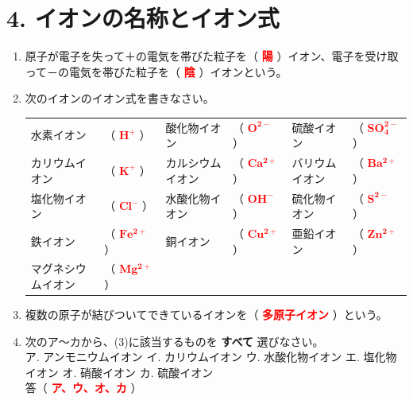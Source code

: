 \section*{4. イオンの名称とイオン式}
\begin{enumerate}
    \item 原子が電子を失って＋の電気を帯びた粒子を（ \textcolor{red}{\textbf{陽}} ）イオン、電子を受け取って－の電気を帯びた粒子を（ \textcolor{red}{\textbf{陰}} ）イオンという。
    \item 次のイオンのイオン式を書きなさい。
    
    \vspace{0.2cm}
    \hspace*{-1.5cm}
    {\renewcommand{\arraystretch}{1.5}
    \begin{tabular}{llllll}
    水素イオン&（ \textcolor{red}{$\mathbf{H^+}$} ） & 酸化物イオン&（ \textcolor{red}{$\mathbf{O^{2-}}$} ） & 硫酸イオン&（ \textcolor{red}{$\mathbf{SO_4^{2-}}$} ） \\
    カリウムイオン&（ \textcolor{red}{$\mathbf{K^+}$} ） & カルシウムイオン&（ \textcolor{red}{$\mathbf{Ca^{2+}}$} ） & バリウムイオン&（ \textcolor{red}{$\mathbf{Ba^{2+}}$} ） \\
    塩化物イオン&（ \textcolor{red}{$\mathbf{Cl^-}$} ） & 水酸化物イオン&（ \textcolor{red}{$\mathbf{OH^-}$} ） & 硫化物イオン&（ \textcolor{red}{$\mathbf{S^{2-}}$} ） \\
    鉄イオン&（ \textcolor{red}{$\mathbf{Fe^{2+}}$} ） & 銅イオン&（ \textcolor{red}{$\mathbf{Cu^{2+}}$} ） & 亜鉛イオン&（ \textcolor{red}{$\mathbf{Zn^{2+}}$} ） \\
    マグネシウムイオン&（ \textcolor{red}{$\mathbf{Mg^{2+}}$} ） &&& & \\
    \end{tabular}}
    \vspace{0.2cm}

    \item 複数の原子が結びついてできているイオンを（ \textcolor{red}{\textbf{多原子イオン}} ）という。
    \item 次のア～カから、(3)に該当するものを \textbf{すべて} 選びなさい。\\[0.2cm]
    ア. アンモニウムイオン \hspace{0.5cm} イ. カリウムイオン \hspace{0.5cm} ウ. 水酸化物イオン \hspace{0.5cm} エ. 塩化物イオン \hspace{0.5cm} オ. 硝酸イオン \hspace{0.5cm} カ. 硫酸イオン\\[0.2cm]
    答（ \textcolor{red}{\textbf{ア、ウ、オ、カ}} ）
\end{enumerate}
